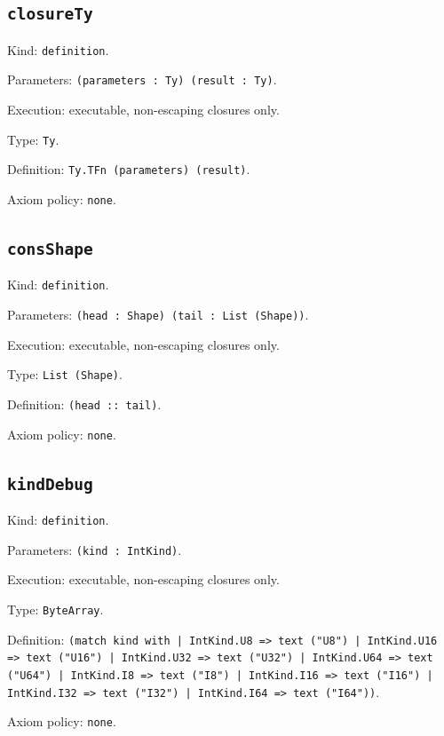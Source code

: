 \documentclass[11pt]{article}
\begin{document}
\subsection*{\texttt{closureTy}}
\noindent Kind: \texttt{definition}.\par
\noindent Parameters: \texttt{(parameters : Ty) (result : Ty)}.\par
\noindent Execution: executable, non-escaping closures only.\par
\noindent Type: \texttt{Ty}.\par
\noindent Definition: \texttt{Ty.TFn (parameters) (result)}.\par
\noindent Axiom policy: \texttt{none}.\par
\subsection*{\texttt{consShape}}
\noindent Kind: \texttt{definition}.\par
\noindent Parameters: \texttt{(head : Shape) (tail : List (Shape))}.\par
\noindent Execution: executable, non-escaping closures only.\par
\noindent Type: \texttt{List (Shape)}.\par
\noindent Definition: \texttt{(head :: tail)}.\par
\noindent Axiom policy: \texttt{none}.\par
\subsection*{\texttt{kindDebug}}
\noindent Kind: \texttt{definition}.\par
\noindent Parameters: \texttt{(kind : IntKind)}.\par
\noindent Execution: executable, non-escaping closures only.\par
\noindent Type: \texttt{ByteArray}.\par
\noindent Definition: \texttt{(match kind with | IntKind.U8 => text ("U8") | IntKind.U16 => text ("U16") | IntKind.U32 => text ("U32") | IntKind.U64 => text ("U64") | IntKind.I8 => text ("I8") | IntKind.I16 => text ("I16") | IntKind.I32 => text ("I32") | IntKind.I64 => text ("I64"))}.\par
\noindent Axiom policy: \texttt{none}.\par
\end{document}
